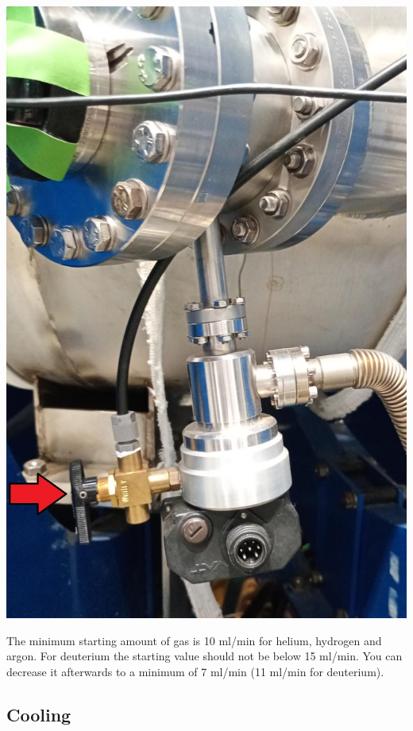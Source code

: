 \documentclass[fleqn,a4paper,20pt]{article}
\begin{document}
\begin{minipage}{.3\textwidth}
	\centering
	\includegraphics[width=\linewidth]{Gas3}
	\label{Gas3}
\end{minipage}	
			
The minimum starting amount of gas is 10 ml/min for helium, hydrogen and argon. For deuterium the starting value should not be below 15 ml/min. You can decrease it afterwards to a minimum of 7 ml/min (11 ml/min for deuterium). 

\subsection{Cooling}
\end{document}

